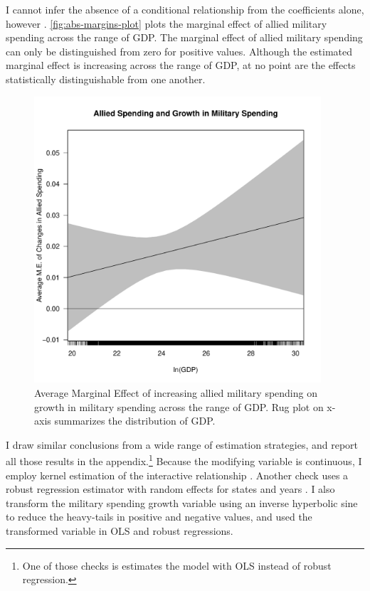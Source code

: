 \documentclass[12pt]{article}
\begin{document}
I cannot infer the absence of a conditional relationship from the coefficients alone, however \citep{BramborClarkGolder2006}. 
\autoref{fig:abs-margins-plot} plots the marginal effect of allied military spending across the range of GDP. 
The marginal effect of allied military spending can only be distinguished from zero for positive values. 
Although the estimated marginal effect is increasing across the range of GDP, at no point are the effects statistically distinguishable from one another. 


\begin{figure}
	\centering
		\includegraphics[width=0.95\textwidth]{abs-margins-plot.pdf}
	\caption{Average Marginal Effect of increasing allied military spending on growth in military spending across the range of GDP. Rug plot on x-axis summarizes the distribution of GDP.}
		\label{fig:abs-margins-plot}
\end{figure}



I draw similar conclusions from a wide range of estimation strategies, and report all those results in the appendix.\footnote{One of those checks is estimates the model with OLS instead of robust regression.}
Because the modifying variable is continuous, I employ kernel estimation of the interactive relationship \citep{Hainmuelleretal2019}.
Another check uses a robust regression estimator with random effects for states and years \citep{Koller2016}. 
I also transform the military spending growth variable using an inverse hyperbolic sine to reduce the heavy-tails in positive and negative values, and used the transformed variable in OLS and robust regressions. 
\end{document}
